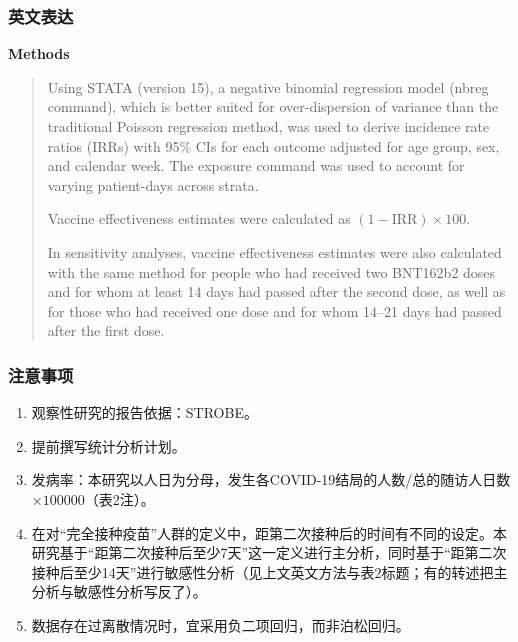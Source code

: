\subsubsection{英文表达}
\textbf{Methods}
\begin{quote}
Using STATA (version 15), a negative binomial regression model (nbreg command), which is better suited for over-dispersion of variance than the traditional Poisson regression method, was used to derive incidence rate ratios (IRRs) with 95\% CIs for each outcome adjusted for age group, sex, and calendar week. The exposure command was used to account for varying patient-days across strata.

Vaccine effectiveness estimates were calculated as $(1-\mathrm{IRR})\times100$.

In sensitivity analyses, vaccine effectiveness estimates were also calculated with the same method for people who had received two BNT162b2 doses and for whom at least 14 days had passed after the second dose, as well as for those who had received one dose and for whom 14--21 days had passed after the first dose.
\end{quote}
\subsubsection{注意事项}
\begin{enumerate}
\item 观察性研究的报告依据：STROBE。
\item 提前撰写统计分析计划。
\item 发病率：本研究以人日为分母，发生各COVID-19结局的人数/总的随访人日数 $\times100000$（表2注）。
\item 在对“完全接种疫苗”人群的定义中，距第二次接种后的时间有不同的设定。本研究基于“距第二次接种后至少7天”这一定义进行主分析，同时基于“距第二次接种后至少14天”进行敏感性分析（见上文英文方法与表2标题；有的转述把主分析与敏感性分析写反了）。
\item 数据存在过离散情况时，宜采用负二项回归，而非泊松回归。
\end{enumerate}
